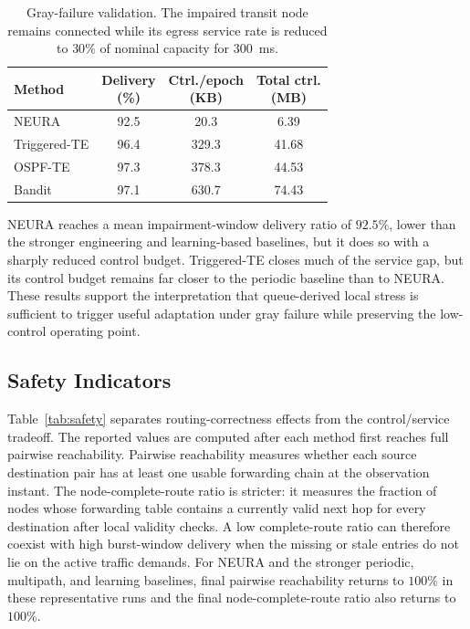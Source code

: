 \documentclass[5p,times]{elsarticle}
\begin{document}
\begin{table}[h]
\centering
\footnotesize
\caption{Gray-failure validation. The impaired transit node remains connected while its egress service rate is reduced to $30\%$ of nominal capacity for $300$~ms.}
\label{tab:gray-failure}
\setlength{\tabcolsep}{3pt}
\renewcommand{\arraystretch}{1.05}
\begin{tabular}{lccc}
\toprule
Method & \shortstack{Delivery\\(\%)} & \shortstack{Ctrl./epoch\\(KB)} & \shortstack{Total ctrl.\\(MB)} \\
\midrule
NEURA & 92.5 & 20.3 & 6.39 \\
Triggered-TE & 96.4 & 329.3 & 41.68 \\
OSPF-TE & 97.3 & 378.3 & 44.53 \\
Bandit & 97.1 & 630.7 & 74.43 \\
\bottomrule
\end{tabular}
\end{table}

NEURA reaches a mean impairment-window delivery ratio of $92.5\%$, lower than the stronger engineering and learning-based baselines, but it does so with a sharply reduced control budget. Triggered-TE closes much of the service gap, but its control budget remains far closer to the periodic baseline than to NEURA. These results support the interpretation that queue-derived local stress is sufficient to trigger useful adaptation under gray failure while preserving the low-control operating point.

\subsection{Safety Indicators}

Table~\ref{tab:safety} separates routing-correctness effects from the control/service tradeoff. The reported values are computed after each method first reaches full pairwise reachability. Pairwise reachability measures whether each source destination pair has at least one usable forwarding chain at the observation instant. The node-complete-route ratio is stricter: it measures the fraction of nodes whose forwarding table contains a currently valid next hop for every destination after local validity checks. A low complete-route ratio can therefore coexist with high burst-window delivery when the missing or stale entries do not lie on the active traffic demands. For NEURA and the stronger periodic, multipath, and learning baselines, final pairwise reachability returns to $100\%$ in these representative runs and the final node-complete-route ratio also returns to $100\%$.
\end{document}
